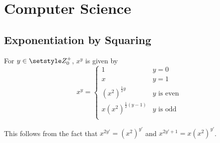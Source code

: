 \section{Computer Science}

\subsection{Exponentiation by Squaring} \label{sec_exp_by_squaring}


For \(y \in \Integers_0^+\), \(x^y\) is given by
\begin{equation}
 x^y =
  \begin{cases}
   1 & y = 0 \\
   x & y = 1 \\
   (x^2)^{\frac 12 y} & \text{\(y\) is even} \\
   x(x^2)^{\frac 12 (y - 1)} & \text{\(y\) is odd} \\
  \end{cases}
\end{equation}

This follows from the fact that
\(x^{2y'} = (x^2)^{y'}\) and \(x^{2y' + 1} = x(x^2)^{y'}\).
